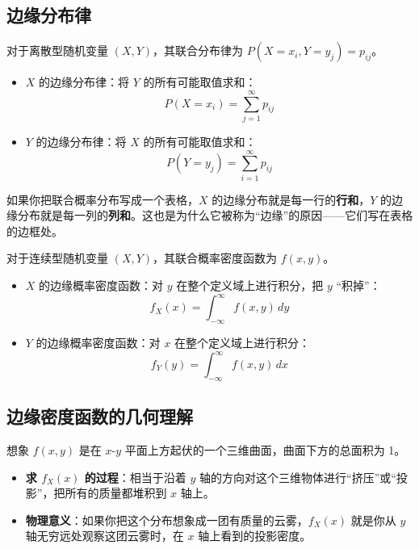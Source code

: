 \subsection{边缘分布律}
\begin{definition}
对于离散型随机变量 $(X, Y)$，其联合分布律为 $P(X=x_i, Y=y_j) = p_{ij}$。
\begin{itemize}
	\item $X$ 的边缘分布律：将 $Y$ 的所有可能取值求和：
	\begin{equation}
		P(X=x_i) = \sum_{j=1}^{\infty} p_{ij}
		\label{eq:第三章:X边缘分布律}
	\end{equation}
	\item $Y$ 的边缘分布律：将 $X$ 的所有可能取值求和：
	\begin{equation}
		P(Y=y_j) = \sum_{i=1}^{\infty} p_{ij}
		\label{eq:第三章:Y边缘分布律}
	\end{equation}
\end{itemize}
\end{definition}

\begin{tipbox}[形象理解]
如果你把联合概率分布写成一个表格，$X$ 的边缘分布就是每一行的\textbf{行和}，$Y$ 的边缘分布就是每一列的\textbf{列和}。这也是为什么它被称为“边缘”的原因——它们写在表格的边框处。
\end{tipbox}

\begin{definition}
对于连续型随机变量 $(X, Y)$，其联合概率密度函数为 $f(x, y)$。
\begin{itemize}
	\item $X$ 的边缘概率密度函数：对 $y$ 在整个定义域上进行积分，把 $y$ “积掉”：
	\begin{equation}
		f_X(x) = \int_{-\infty}^{\infty} f(x, y)\,dy
		\label{eq:第三章:X边缘密度}
	\end{equation}
	\item $Y$ 的边缘概率密度函数：对 $x$ 在整个定义域上进行积分：
	\begin{equation}
		f_Y(y) = \int_{-\infty}^{\infty} f(x, y)\,dx
		\label{eq:第三章:Y边缘密度}
	\end{equation}
\end{itemize}
\end{definition}

\subsection{边缘密度函数的几何理解}
\begin{tipbox}[几何理解]
想象 $f(x, y)$ 是在 $x$-$y$ 平面上方起伏的一个三维曲面，曲面下方的总面积为 1。
\begin{itemize}
	\item \textbf{求 $f_X(x)$ 的过程}：相当于沿着 $y$ 轴的方向对这个三维物体进行“挤压”或“投影”，把所有的质量都堆积到 $x$ 轴上。
	\item \textbf{物理意义}：如果你把这个分布想象成一团有质量的云雾，$f_X(x)$ 就是你从 $y$ 轴无穷远处观察这团云雾时，在 $x$ 轴上看到的投影密度。
\end{itemize}
\end{tipbox}

